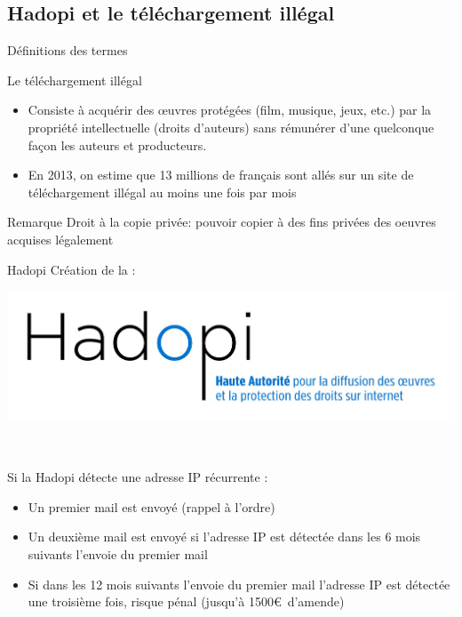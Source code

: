 \documentclass{beamer}
\begin{document}
\subsection{Hadopi et le téléchargement illégal}
\begin{frame}{Définitions des termes}
    \begin{block}{Le téléchargement illégal} 
    \begin{itemize}
        \item Consiste à acquérir des œuvres protégées (film, musique, jeux, etc.) par la propriété intellectuelle (droits d'auteurs) sans rémunérer d'une quelconque façon les auteurs et producteurs.
        \item En 2013, on estime que 13 millions de français sont allés sur un site de téléchargement illégal au moins une fois par mois
    \end{itemize}
   \end{block}
   \begin{alertblock}{Remarque}
    Droit à la copie privée: pouvoir copier à des fins privées des oeuvres acquises légalement
   \end{alertblock}
    
\end{frame}
\begin{frame}{Hadopi}
  Création de la : \\
  \centerline{\includegraphics[scale=0.4]{hadopi.jpg}}
  \\ %
  \begin{block}{Si la Hadopi détecte une adresse IP récurrente :}
  \begin{itemize}
      \item Un premier mail est envoyé (rappel à l'ordre)
      \item Un deuxième mail est envoyé si l'adresse IP est détectée dans les 6 mois suivants l'envoie du premier mail
      \item Si dans les 12 mois suivants l'envoie du premier mail l'adresse IP est détectée une troisième fois, risque pénal (jusqu'à 1500\euro ~d'amende)
  \end{itemize}
  \end{block}
  
\end{frame} 
\end{document}
